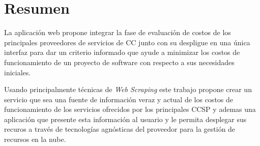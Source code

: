 

\begingroup
\let\clearpage\relax
\let\cleardoublepage\relax
\let\cleardoublepage\relax




\chapter*{Resumen}
La aplicación web \appName propone integrar la fase de evaluación de costos de los principales proveedores de servicios de \acrfull{CC} junto con su despligue en una única interfaz para dar un criterio informado que ayude a minimizar los costos de funcionamiento de un proyecto de software con respecto a sus necesidades iniciales.\bigskip

Usando principalmente técnicas de \emph{Web Scraping} este trabajo propone crear un servicio que sea una fuente de información veraz y actual de los costos de funcionamiento de los servicios ofrecidos por los principales \acrfull{CCSP} y ademas una aplicación que presente esta información al usuario y le permita desplegar sus recuros a través de tecnologías agnósticas del proveedor para la gestión de recursos en la nube.
\endgroup			

\vfill